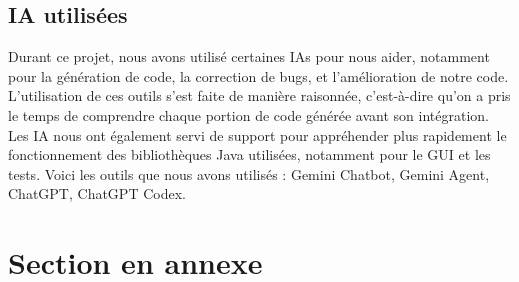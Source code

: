 \documentclass[a4paper]{article}
\begin{document}
\subsection{IA utilisées}

Durant ce projet, nous avons utilisé certaines IAs pour nous aider, notamment pour la génération de code, la correction de bugs, et l'amélioration de notre code. L'utilisation de ces outils s'est faite de manière raisonnée, c'est-à-dire qu'on a pris le temps de comprendre chaque portion de code générée avant son intégration. Les IA nous ont également servi de support pour appréhender plus rapidement le fonctionnement des bibliothèques Java utilisées, notamment pour le GUI et les tests. Voici les outils que nous avons utilisés : Gemini Chatbot, Gemini Agent, ChatGPT, ChatGPT Codex.




\nocite{*}



\appendix

\section{Section en annexe}
\end{document}
